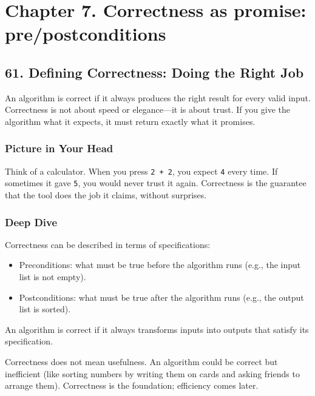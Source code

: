 \documentclass[
  letterpaper,
  DIV=11,
  numbers=noendperiod]{scrreprt}
\providecommand{\tightlist}{%
  \setlength{\itemsep}{0pt}\setlength{\parskip}{0pt}}
\begin{document}
\section{Chapter 7. Correctness as promise:
pre/postconditions}\label{chapter-7.-correctness-as-promise-prepostconditions}

\subsection{61. Defining Correctness: Doing the Right
Job}\label{defining-correctness-doing-the-right-job}

An algorithm is correct if it always produces the right result for every
valid input. Correctness is not about speed or elegance---it is about
trust. If you give the algorithm what it expects, it must return exactly
what it promises.

\subsubsection{Picture in Your Head}\label{picture-in-your-head-60}

Think of a calculator. When you press \texttt{2\ +\ 2}, you expect
\texttt{4} every time. If sometimes it gave \texttt{5}, you would never
trust it again. Correctness is the guarantee that the tool does the job
it claims, without surprises.

\subsubsection{Deep Dive}\label{deep-dive-30}

Correctness can be described in terms of specifications:

\begin{itemize}
\tightlist
\item
  Preconditions: what must be true before the algorithm runs (e.g., the
  input list is not empty).
\item
  Postconditions: what must be true after the algorithm runs (e.g., the
  output list is sorted).
\end{itemize}

An algorithm is correct if it always transforms inputs into outputs that
satisfy its specification.

Correctness does not mean usefulness. An algorithm could be correct but
inefficient (like sorting numbers by writing them on cards and asking
friends to arrange them). Correctness is the foundation; efficiency
comes later.
\end{document}
